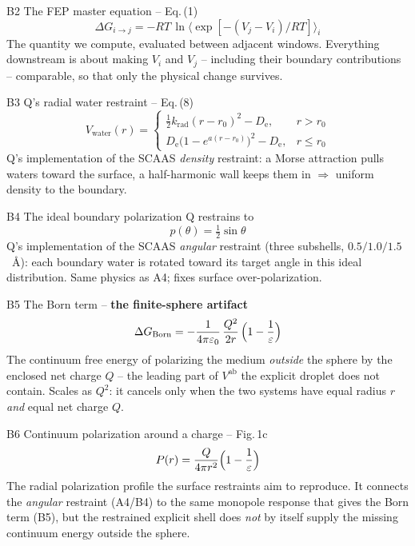 \documentclass[11pt]{article}
\newcommand{\gap}{\vspace{10pt}}
\newcommand{\eq}[1]{{\large\[#1\]}}
\begin{document}
\begin{born}{B2 \;\textbullet\; The FEP master equation \;--\; Eq.\,(1)}
\eq{\Delta G_{i\rightarrow j}=-RT\,\ln\bigl\langle\exp[-(V_j-V_i)/RT]\bigr\rangle_i}
\small The quantity we compute, evaluated between adjacent windows. Everything downstream is about
making $V_i$ and $V_j$ -- including their boundary contributions -- comparable, so that only the
physical change survives.
\end{born}
\gap

\begin{born}{B3 \;\textbullet\; Q's radial water restraint \;--\; Eq.\,(8)}
\eq{V_{\text{water}}(r)=
\begin{cases}
\tfrac12 k_{\mathrm{rad}}(r-r_0)^2-D_{\mathrm e}, & r>r_0\\[4pt]
D_{\mathrm e}\bigl(1-e^{a(r-r_0)}\bigr)^2-D_{\mathrm e}, & r\le r_0
\end{cases}}
\small Q's implementation of the SCAAS \emph{density} restraint: a Morse attraction pulls waters
toward the surface, a half-harmonic wall keeps them in $\Rightarrow$ uniform density to the boundary.
\end{born}
\gap

\begin{born}{B4 \;\textbullet\; The ideal boundary polarization Q restrains to}
\eq{p(\theta)=\tfrac12\sin\theta}
\small Q's implementation of the SCAAS \emph{angular} restraint (three subshells, $0.5/1.0/1.5$~\AA):
each boundary water is rotated toward its target angle in this ideal distribution. Same physics as
A4; fixes surface over-polarization.
\end{born}
\gap

\begin{born}{B5 \;\textbullet\; The Born term \;--\; \textbf{the finite-sphere artifact}}
\eq{\Delta G_{\text{Born}}=-\frac{1}{4\pi\varepsilon_0}\,\frac{Q^2}{2r}\,\Bigl(1-\frac{1}{\varepsilon}\Bigr)}
\small The continuum free energy of polarizing the medium \emph{outside} the sphere by the enclosed
net charge $Q$ -- the leading part of $V^{\mathrm{ab}}$ the explicit droplet does not contain.
Scales as $Q^2$: it cancels only when the two systems have equal radius $r$ \emph{and} equal net
charge $Q$.
\end{born}
\gap

\begin{born}{B6 \;\textbullet\; Continuum polarization around a charge \;--\; Fig.\,1c}
\eq{P(r)=\frac{Q}{4\pi r^2}\Bigl(1-\frac{1}{\varepsilon}\Bigr)}
\small The radial polarization profile the surface restraints aim to reproduce. It connects the
\emph{angular} restraint (A4/B4) to the same monopole response that gives the Born term (B5), but
the restrained explicit shell does \emph{not} by itself supply the missing continuum energy outside
the sphere.
\end{born}
\gap
\end{document}
